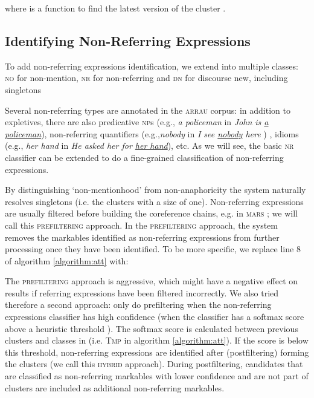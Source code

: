 \documentclass[10pt, a4paper]{article}
\newcommand{\ACRO}[1]{\textsc{#1}}
\newcommand{\ARRAU}{\ACRO{arrau}}
\newcommand{\DN}{\ACRO{dn}}
\newcommand{\NO}{\ACRO{no}}
\newcommand{\NR}{\ACRO{nr}}
\newcommand{\NP}{\ACRO{np}}
\newcommand{\PREFILTERING}{\ACRO{prefiltering}}
\newcommand{\HYBRID}{\ACRO{hybrid}}
\begin{document}
where  is a function to find the latest version of the cluster .





\subsection{Identifying Non-Referring Expressions}

To add  non-referring expressions identification, we extend  into multiple classes:
{\NO} for non-mention, 
{\NR} for non-referring and 
{\DN} for discourse new, including singletons

\small

\normalsize

Several non-referring types are annotated in the {\ARRAU} corpus: in addition to expletives, there are also predicative {\NP}s (e.g., \textit{a policeman} in \textit{John is \underline{a policeman}}), non-referring quantifiers (e.g.,\textit{nobody} in \textit{I see \underline{nobody} here} ) \cite{karttunen:76}, idioms (e.g., \textit{her hand} in \textit{He asked her for \underline{her hand}}), etc.
As we will see, the basic {\NR} classifier can be  extended 
to do 
a fine-grained classification of non-referring expressions. 

By distinguishing 
`non-mentionhood' from 
non-anaphoricity the system naturally resolves  singletons (i.e. the clusters with a size of one).   
Non-referring expressions are usually  filtered before building the coreference chains, e.g. in  \ACRO{mars}  \cite{mitkov2002new}; 
we will call this {\PREFILTERING} approach. 
In the {\PREFILTERING} approach, the system removes the markables identified as non-referring expressions from further processing once they have been identified. To be more specific, we replace line 8 of algorithm \ref{algorithm:att} with:

\vspace{-10pt}
\small

\normalsize



The {\PREFILTERING} approach is aggressive,  which might have a negative effect on results if referring expressions have been filtered incorrectly. 
We also tried therefore a second approach: only do prefiltering when the non-referring expressions classifier has high confidence (when the classifier has a softmax score above a heuristic threshold ). The softmax score is calculated between previous clusters and classes in  (i.e. \textsc{Tmp} in algorithm \ref{algorithm:att}). 
If the score is below this threshold,
non-referring expressions are identified after (postfiltering) forming the clusters (we call this {\HYBRID} approach). During postfiltering, candidates that are classified as non-referring markables with lower confidence and are not part of clusters are included as additional non-referring markables. 
\end{document}
